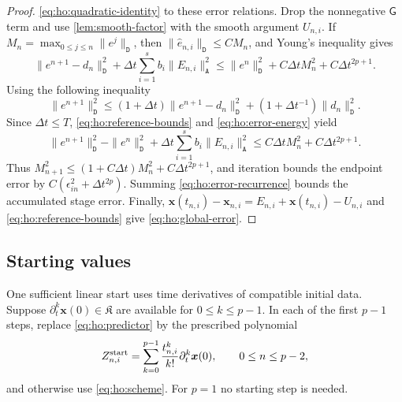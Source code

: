 \documentclass[11pt,a4paper]{article}
\newcommand{\bs}{\boldsymbol}
\newcommand{\dt}{\Delta t}
\newcommand{\DD}{\mathtt D}
\newcommand{\Aform}{\mathtt A}
\theoremstyle{definition}
\newtheorem{remark}[remark]{Remark}
\numberwithin{equation}{section}
\begin{document}
\begin{proof}
\eqref{eq:ho:quadratic-identity} to these error relations. Drop the
nonnegative $\mathsf G$ term and use \cref{lem:smooth-factor} with the smooth
argument $U_{n,i}$. If
$M_n=\max_{0\le j\le n}\|e^j\|_{\DD}$, then
$\|\widehat e_{n,i}\|_{\DD}\le C M_n$, and Young's inequality gives
\begin{equation}\label{eq:ho:error-energy}
 \|e^{n+1}-d_n\|_{\DD}^2
 +\dt\sum_{i=1}^s b_i\|E_{n,i}\|_{\Aform}^2
 \le\|e^n\|_{\DD}^2+C\dt M_n^2+C\dt^{2p+1}.
\end{equation}
Using the following inequality
\[
 \|e^{n+1}\|_{\DD}^2
 \le(1+\dt)\|e^{n+1}-d_n\|_{\DD}^2
                  +(1+\dt^{-1})\|d_n\|_{\DD}^2.
\]
Since $\dt\le T$, \eqref{eq:ho:reference-bounds} and
\eqref{eq:ho:error-energy} yield
\begin{equation}\label{eq:ho:error-recurrence}
 \|e^{n+1}\|_{\DD}^2-\|e^n\|_{\DD}^2
 +\dt\sum_{i=1}^s b_i\|E_{n,i}\|_{\Aform}^2
 \le C\dt M_n^2+C\dt^{2p+1}.
\end{equation}
Thus $M_{n+1}^2\le(1+C\dt)M_n^2+C\dt^{2p+1}$, and iteration bounds the
endpoint error by $C(\epsilon_{in}^2+\dt^{2p})$. Summing
\eqref{eq:ho:error-recurrence} bounds the accumulated stage error. Finally,
$\bs x(t_{n,i})-\bs x_{n,i}=E_{n,i}+ \bs x(t_{n,i})-U_{n,i}$ and
\eqref{eq:ho:reference-bounds} give \eqref{eq:ho:global-error}.
\end{proof}


\subsection{Starting values}
One sufficient linear start uses time derivatives of compatible initial data.
Suppose $\partial_t^k\bs x(0)\in\mathfrak K$ are available for
$0\le k\le p-1$. In each of the first $p-1$ steps, replace
\eqref{eq:ho:predictor} by the prescribed polynomial
\begin{equation}\label{eq:ho:Taylor-start}
 Z_{n,i}^{\rm start}=\sum_{k=0}^{p-1}
                 \frac{t_{n,i}^{k}}{k!}\partial_t^k\bs x(0),
 \qquad 0\le n\le p-2,
\end{equation}
and otherwise use \eqref{eq:ho:scheme}. For $p=1$ no starting step is needed.
\end{document}
